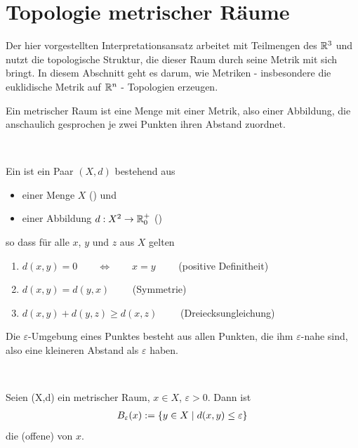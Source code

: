     


\section{Topologie metrischer Räume}\label{sec:top-metr-raeume}

    Der hier vorgestellten Interpretationsansatz arbeitet mit Teilmengen des $\mathbb{R}^3$ und nutzt die topologische Struktur, die dieser Raum durch seine Metrik mit sich bringt.
    In diesem Abschnitt geht es darum, wie Metriken - insbesondere die euklidische Metrik auf $\mathbb{R}^n$ - Topologien erzeugen.
    
    Ein
    metrischer Raum ist eine Menge mit einer Metrik, also einer Abbildung, die anschaulich gesprochen je zwei Punkten ihren Abstand zuordnet.
    \begin{dfn}\label{def:metr}\ \vspace{8pt}

        \noindent
        Ein  ist ein Paar $(X,d)$ bestehend aus
        \begin{itemize}
            \item einer Menge $X$ () und
            \item einer Abbildung $ d: X^2 \rightarrow \mathbb{R}_0^+$ ()
        \end{itemize}
        so dass für alle $x$, $y$ und $z$ aus $X$ gelten
        \begin{enumerate}
            \item $d(x,y) = 0 \quad \quad \Leftrightarrow \quad \quad x=y \qquad$ (positive Definitheit) 
            \item $d(x,y) = d(y,x) \qquad$ (Symmetrie)
            \item $d(x,y) + d(y,z) \geq d(x,z) \qquad$ (Dreiecksungleichung)
        \end{enumerate}
    \end{dfn}


    Die
    $\varepsilon$-Umgebung eines Punktes besteht aus allen Punkten, die ihm $\varepsilon$-nahe sind, also eine kleineren Abstand als $\varepsilon$ haben.
    \begin{dfn}\label{def:eps-umg}\ \vspace{8pt}

        \noindent
        Seien (X,d) ein metrischer Raum, $x \in X$, $\varepsilon > 0$. Dann ist
        \begin{align*}
            B_\varepsilon(x) := \{y \in X \mid d(x,y) \leq \varepsilon \}
        \end{align*}
        die (offene)  von $x$.
        
    \end{dfn}


